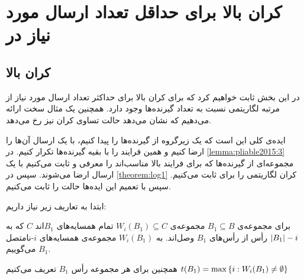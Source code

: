 \section{کران بالا برای حداقل تعداد ارسال مورد نیاز در
\picod}

\subsection{کران بالا}
در این بخش ثابت خواهیم کرد که برای
\picodt
کران بالا برای حداکثر تعداد ارسال مورد نیاز از مرتبه لگاریتمی نسبت به تعداد گیرنده‌ها وجود دارد. همچنین یک مثال سخت ارائه می‌دهیم که نشان می‌دهد حالت تساوی کران نیز رخ می‌دهد.

ایده‌ی کلی این است که یک زیرگروه از گیرنده‌ها را پیدا کنیم، با یک ارسال آن‌ها را ارضا کنیم و همین فرایند را با بقیه گیرنده‌ها تکرار کنیم. در
\autoref{lemma:pliable2015:3}
مجموعه‌ای از گیرنده‌ها که برای فرایند بالا مناسب‌اند را معرفی و ثابت می‌کنیم با یک ارسال ارضا می‌شوند. سپس در
\autoref{theorem:log1}
کران لگاریتمی را برای
ثابت می‌کنیم. سپس با تعمیم این ایده‌ها حالت
را ثابت می‌کنیم.

ابتدا به تعاریف زیر نیاز داریم:
\begin{definition}
    \label{def:nonnei}
    برای مجموعه‌ی
    $B_1 \subseteq B$
    مجموعه‌ی
    $W_i(B_1) \subseteq C$
    تمام همسایه‌های
    $B_1$اند
    $C$
    که به
    $\left|{B_1}\right| - i$
    رأس از رأس‌های
    $B_1$
    وصل‌اند. به
    $W_i(B_1)$
    مجموعه‌ی همسایه‌های
    $i$-نامتصل
    $B_1$
    می‌گوییم.

    همچنین برای هر مجموعه‌ رأس
    $B_1$
    تعریف می‌کنیم
    $t(B_1) = \max\left\{ i: W_i(B_1) \neq \emptyset  \right\}$
\end{definition}

